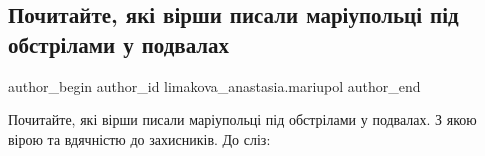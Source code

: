  
 
 
 
 

\subsection{Почитайте, які вірши писали маріупольці під обстрілами у подвалах}
\label{sec:26_03_2022.fb.limakova_anastasia.mariupol.1.pochitaite__yak__v_r}

\ifcmt
 author_begin
   author_id limakova_anastasia.mariupol
 author_end
\fi

Почитайте, які вірши писали маріупольці під обстрілами у подвалах. З якою вірою та вдячністю до захисників. До сліз: 

